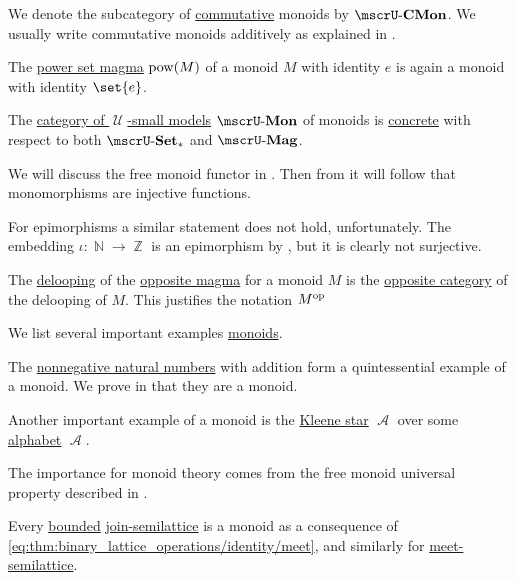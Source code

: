 \begin{definition}
\begin{thmenum}
    We denote the subcategory of \hyperref[def:magma/commutative]{commutative} monoids by \( \ucat{CMon} \). We usually write commutative monoids additively as explained in .

     The \hyperref[def:magma/power_set]{power set magma} \( \operatorname{pow}(M) \) of a monoid \( M \) with identity \( e \) is again a monoid with identity \( \set{ e } \).

     The \hyperref[def:category_of_small_first_order_models]{category of \( \mscrU \)-small models} \( \ucat{Mon} \) of monoids is \hyperref[def:concrete_category]{concrete} with respect to both \hyperref[def:pointed_set/category]{\( \ucat{Set}_* \)} and \hyperref[def:magma/category]{\( \ucat{Mag} \)}.

    We will discuss the free monoid functor in . Then from  it will follow that monomorphisms are injective functions.

    For epimorphisms a similar statement does not hold, unfortunately. The embedding \( \iota: \BbbN \to \BbbZ \) is an epimorphism by , but it is clearly not surjective.

     The \hyperref[def:monoid_delooping]{delooping} of the \hyperref[def:magma/opposite]{opposite magma} for a monoid \( M \) is the \hyperref[def:opposite_category]{opposite category} of the delooping of \( M \). This justifies the notation \( M^{\operatorname{op}} \)
  \end{thmenum}
\end{definition}

\begin{example}\label{ex:def:monoid}
  We list several important examples \hyperref[def:monoid]{monoids}.

  \begin{thmenum}
     The \hyperref[def:set_of_natural_numbers]{nonnegative natural numbers} with addition form a quintessential example of a monoid. We prove in  that they are a monoid.

     Another important example of a monoid is the \hyperref[def:formal_language/kleene_star]{Kleene star} \( \mscrA \) over some \hyperref[def:formal_language/alphabet]{alphabet} \( \mscrA \).

    The importance for monoid theory comes from the free monoid universal property described in .

     Every \hyperref[def:semilattice/bounded]{bounded} \hyperref[def:semilattice/join]{join-semilattice} is a monoid as a consequence of \eqref{eq:thm:binary_lattice_operations/identity/meet}, and similarly for \hyperref[def:semilattice/meet]{meet-semilattice}.
  \end{thmenum}
\end{example}

